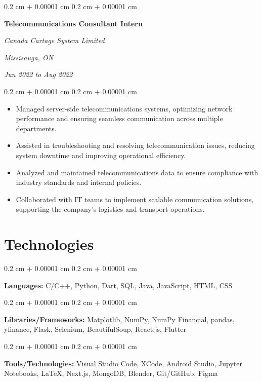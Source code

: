 \documentclass[10pt, letterpaper]{article}
\newenvironment{highlights}{
    \begin{itemize}[
        topsep=0.10 cm,
        parsep=0.10 cm,
        partopsep=0pt,
        itemsep=0pt,
        leftmargin=0.4 cm + 10pt
    ]
}{
    \end{itemize}
} %
\newenvironment{onecolentry}{
    \begin{adjustwidth}{
        0.2 cm + 0.00001 cm
    }{
        0.2 cm + 0.00001 cm
    }
}{
    \end{adjustwidth}
} %
\newenvironment{twocolentry}[2][]{
    \onecolentry
    \def\secondColumn{#2}
    \setcolumnwidth{\fill, 4.5 cm}
    \begin{paracol}{2}
}{
    \switchcolumn \raggedleft \secondColumn
    \end{paracol}
    \endonecolentry
} %
\begin{document}
        \vspace{0.2 cm}

        \begin{twocolentry}{
        \textit{Missisauga, ON}    
            
        \textit{Jun 2022 to Aug 2022}}
            \textbf{Telecommunications Consultant Intern}
            
            \textit{Canada Cartage System Limited}
        \end{twocolentry}

        \vspace{0.10 cm}
        \begin{onecolentry}
            \begin{highlights}
                \item Managed server-side telecommunications systems, optimizing network performance and ensuring seamless communication across multiple departments.
                \item Assisted in troubleshooting and resolving telecommunication issues, reducing system downtime and improving operational efficiency.
                \item Analyzed and maintained telecommunications data to ensure compliance with industry standards and internal policies.
                \item Collaborated with IT teams to implement scalable communication solutions, supporting the company's logistics and transport operations.
            \end{highlights}
        \end{onecolentry}



    
    \section{Technologies}



        
        \begin{onecolentry}
            \textbf{Languages:} C/C++, Python, Dart, SQL, Java, JavaScript, HTML, CSS
        \end{onecolentry}

        \vspace{0.2 cm}

        \begin{onecolentry}
            \textbf{Libraries/Frameworks:} Matplotlib, NumPy, NumPy Financial, pandas, yfinance, Flask, Selenium, BeautifulSoup, React.js, Flutter
        \end{onecolentry}

        \vspace{0.2 cm}

        \begin{onecolentry}
            \textbf{Tools/Technologies:} Visual Studio Code, XCode, Android Studio, Jupyter Notebooks, LaTeX, Next.js, MongoDB, Blender, Git/GitHub, Figma
        \end{onecolentry}


    
\end{document}
